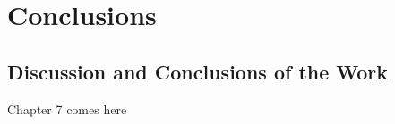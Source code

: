 \chapter{Conclusions}
\label{chapter:seven}


\section{Discussion and Conclusions of the Work}

Chapter 7 comes here